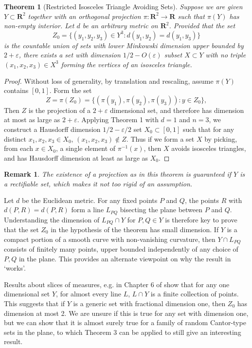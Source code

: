 \documentclass[dvipsnames]{article}
\theoremstyle{plain}
\theoremstyle{plain}
\newtheorem{theorem}{Theorem}
\newtheorem*{remark}{Remark}
\begin{document}
\begin{theorem}[Restricted Isosceles Triangle Avoiding Sets]
	Suppose we are given $Y \subset \mathbf{R}^2$ together with an orthogonal projection $\pi: \mathbf{R}^2 \to \mathbf{R}$ such that $\pi(Y)$ has non-empty interior. Let $d$ be an arbitrary metric on $\mathbf{R}^2$. Provided that the set
	\[ Z_0 = \{ (y_1,y_2,y_3) \in Y^3 : d(y_1,y_2) = d(y_1,y_3) \} \]
	is the countable union of sets with lower Minkowski dimension upper bounded by $2 + \varepsilon$, there exists a set with dimension $1/2 - O(\varepsilon)$ subset $X \subset Y$ with no triple $(x_1,x_2,x_3) \in X^3$ forming the vertices of an isosceles triangle.
\end{theorem}
\begin{proof}
	Without loss of generality, by translation and rescaling, assume $\pi(Y)$ contains $[0,1]$. Form the set
	\[ Z = \pi(Z_0) = \{ (\pi(y_1), \pi(y_2), \pi(y_3)) : y \in Z_0 \}, \]
	Then $Z$ is the projection of a $2 + \varepsilon$ dimensional set, and therefore has dimension at most as large as $2 + \varepsilon$. Applying Theorem 1 with $d = 1$ and $n = 3$, we construct a Hausdorff dimension $1/2 - \varepsilon / 2$ set $X_0 \subset [0,1]$ such that for any distinct $x_1, x_2, x_3 \in X_0$, $(x_1, x_2, x_3) \not \in Z$. Thus if we form a set $X$ by picking, from each $x \in X_0$, a single element of $\pi^{-1}(x)$, then $X$ avoids isosceles triangles, and has Hausdorff dimension at least as large as $X_0$.
\end{proof}

\begin{remark}
	The existence of a projection as in this theorem is guaranteed if $Y$ is a rectifiable set, which makes it not too rigid of an assumption. 
\end{remark}

Let $d$ be the Euclidean metric. For any fixed points $P$ and $Q$, the points $R$ with $d(P,R) = d(P,R)$ form a line $L_{PQ}$ bisecting the plane between $P$ and $Q$. Understanding the dimension of $L_{PQ} \cap Y$ for $P,Q \in Y$ is therefore key to prove that the set $Z_0$ in the hypothesis of the theorem has small dimension. If $Y$ is a compact portion of a smooth curve with non-vanishing curvature, then $Y \cap L_{PQ}$ consists of finitely many points, upper bounded independently of any choice of $P,Q$ in the plane. This provides an alternate viewpoint on why the result in \cite{MalabikaRob} `works'.

Results about slices of measures, e.g. in Chapter 6 of \cite{Matilla} show that for any one dimensional set $Y$, for almost every line $L$, $L \cap Y$ is a finite collection of points. This suggests that if $Y$ is a generic set with fractional dimension one, then $Z_0$ has dimension at most 2. We are unsure if this is true for any set with dimension one, but we can show that it is almost surely true for a family of random Cantor-type sets in the plane, to which Theorem 3 can be applied to still give an interesting result.
\end{document}
